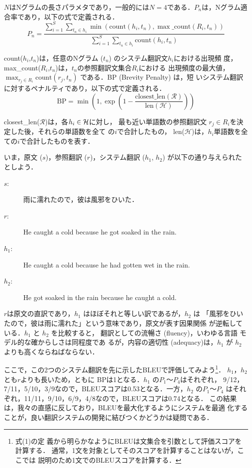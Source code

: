 \documentclass[japanese]{jnlp_1.4}
\begin{document}
$N$はNグラムの長さパラメタであり，一般的には$N=4$である．$P_n$は，Nグラム適
合率であり，以下の式で定義される．
\begin{equation}
P_n=\frac{\displaystyle \sum_{i=1}^S\displaystyle\sum_{t_n \in h_i} \min(\text{count}(h_i,t_n),
	\max\_\text{count}(R_i,t_n))}{\displaystyle \sum_{i=1}^S \displaystyle\sum_{t_n \in h_i}\text{count}(h_i,t_n)}
\end{equation}

count($h_i$,$t_n$)は，任意のNグラム ($t_n$) のシステム翻訳文$h_i$における出現頻
度，
max\_count($R_i$,$t_n$)は，$t_n$の参照翻訳文集合$R_i$における
出現頻度の最大値，$\max_{r_j \in R_i}\text{count}(r_j,t_n)$
である．BP (Brevity Penalty) は，短
いシステム翻訳に対するペナルティであり，以下の式で定義される．
\begin{equation}
 \text{BP}=\min \left( 1,\exp \left( 1-\frac{\text{closest}\_\text{len}(\mathcal{R})}{\text{len}(\mathcal{H})}\right)\right)
\end{equation}

closest\_len($\mathcal R$)は，各$h_i \in {\cal H}$に対し，
最も近い単語数の参照翻訳文 $r_j \in R_i$を決定した後，それらの単語数を全て
の$i$で合計したもの，
len($\mathcal{H}$)は，$h_i$単語数を全ての$i$で合計したものを表す．

いま，原文 ($s$)，参照翻訳 ($r$)，システム翻訳 ($h_1$, $h_2$) が以下の通り与えられた
としよう．

\begin{description}
 \item[{\mdseries $s$:}] 雨に濡れたので，彼は風邪をひいた．
 \item[{\mdseries $r$:}] He caught a cold because he got soaked in the rain.
 \item[{\mdseries $h_1$:}] He caught a cold because he had gotten wet in the rain.
 \item[{\mdseries $h_2$:}] He got soaked in the rain because he caught a cold.
\end{description}

$r$は原文の直訳であり，$h_1$ はほぼそれと等しい訳であるが，$h_2$ は
「風邪をひいたので，彼は雨に濡れた」という意味であり，原文が表す因果関係
が逆転している．$h_1$ と $h_2$ を比較すると，
翻訳としての流暢さ (fluency)，いわゆる言語
モデル的な確からしさは同程度であ
るが，内容の適切性 (adequacy)は，$h_1$ が $h_2$ よりも高くならねばならない．

ここで，この2つのシステム翻訳を先に示したBLEUで評価してみよう\footnote{式(1)の定
義から明らかなようにBLEUは文集合を引数として評価スコアを計算する．
通常，1文を対象としてそのスコアを計算することはないが，ここでは
説明のため1文でのBLEUスコアを計算する．}．
$h_1$，$h_2$ とも$r$よりも長いため，ともに BPは1となる．$h_1$ の$P_1$〜$P_4$はそれぞれ，
9/12，7/11，5/10，3/9なので，BLEUスコアは0.53となる．一方，$h_2$ の$P_1$〜$P_4$
はそれぞれ，11/11，9/10，6/9，4/8なので，BLEUスコアは0.74となる．
この結果は，我々の直感に反しており，BLEUを最大化するようにシステムを最適
化することが，良い翻訳システムの開発に結びつくかどうかは疑問である．
\end{document}
